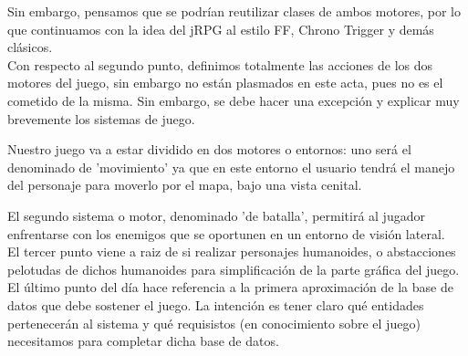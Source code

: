 \documentclass[a4paper,10pt]{article}
\begin{document}
\noindent Sin embargo, pensamos que se podrían reutilizar clases de
ambos motores, por lo que continuamos con la idea del jRPG al estilo
FF, Chrono Trigger y demás clásicos.\\

\noindent Con respecto al segundo punto, definimos totalmente las
acciones de los dos motores del juego, sin embargo no están plasmados
en este acta, pues no es el cometido de la misma. Sin embargo, se debe
hacer una excepción y explicar muy brevemente los sistemas de
juego. 

\noindent Nuestro juego va a estar dividido en dos motores o entornos:
uno será el denominado de 'movimiento' ya que en este entorno el
usuario tendrá el manejo del personaje para moverlo por el mapa, bajo
una vista cenital.

\noindent El segundo sistema o motor, denominado 'de batalla', permitirá
al jugador enfrentarse con los enemigos que se oportunen en un entorno
de visión lateral. \\

\noindent El tercer punto viene a raiz de si realizar personajes
humanoides, o abstacciones pelotudas de dichos humanoides para
simplificación de la parte gráfica del juego. \\

\noindent El último punto del día hace referencia a la primera
aproximación de la base de datos que debe sostener el juego. La
intención es tener claro qué entidades pertenecerán al sistema y qué
requisistos (en conocimiento sobre el juego) necesitamos para
completar dicha base de datos. \\
\end{document}
